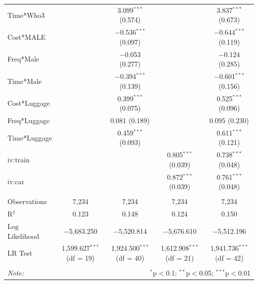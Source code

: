 \documentclass[a4paper, 12pt]{article}
\begin{document}
\begin{appendix}
\begin{table}[!htbp]
{\begin{tabular}{@{\extracolsep{5pt}}lcccc}
  Time*Who3 &  & 3.099$^{***}$ (0.574) &  & 3.837$^{***}$ (0.673) \\ 
  Cost*MALE &  & $-$0.536$^{***}$ (0.097) &  & $-$0.644$^{***}$ (0.119) \\ 
  Freq*Male &  & $-$0.053 (0.277) &  & $-$0.124 (0.285) \\ 
  Time*Male &  & $-$0.394$^{***}$ (0.139) &  & $-$0.601$^{***}$ (0.156) \\ 
  Cost*Luggage &  & 0.399$^{***}$ (0.075) &  & 0.525$^{***}$ (0.096) \\ 
  Freq*Luggage &  & 0.081 (0.189) &  & 0.095 (0.230) \\ 
  Time*Luggage &  & 0.459$^{***}$ (0.093) &  & 0.611$^{***}$ (0.121) \\ 
  iv:train &  &  & 0.805$^{***}$ (0.039) & 0.738$^{***}$ (0.048) \\ 
  iv:car &  &  & 0.872$^{***}$ (0.039) & 0.761$^{***}$ (0.048) \\ 
 \hline \\[-1.8ex] 
Observations & 7,234 & 7,234 & 7,234 & 7,234 \\ 
R$^{2}$ & 0.123 & 0.148 & 0.124 & 0.150 \\ 
Log Likelihood & $-$5,683.250 & $-$5,520.814 & $-$5,676.610 & $-$5,512.196 \\ 
LR Test & 1,599.627$^{***}$ (df = 19) & 1,924.500$^{***}$ (df = 40) & 1,612.908$^{***}$ (df = 21) & 1,941.736$^{***}$ (df = 42) \\ 
\hline 
\hline \\[-1.8ex] 
\textit{Note:}  & \multicolumn{4}{r}{$^{*}$p$<$0.1; $^{**}$p$<$0.05; $^{***}$p$<$0.01} \\ 
\end{tabular} 
}
\end{table}
\end{appendix}
\end{document}
